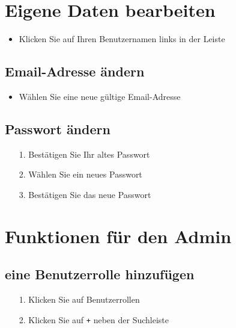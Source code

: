 \documentclass[11pt,a4paper]{report}
\begin{document}
	\section{Eigene Daten bearbeiten}
	\begin{itemize}
		\item Klicken Sie auf Ihren Benutzernamen links in der Leiste
	\end{itemize}

	\subsection{Email-Adresse ändern}
		\begin{itemize}
		\item Wählen Sie eine neue gültige Email-Adresse
	\end{itemize}

	\subsection{Passwort ändern}
	\begin{itemize}
		\item[1.] Bestätigen Sie Ihr altes Passwort
		\item[2.] Wählen Sie ein neues Passwort
		\item[3.] Bestätigen Sie das neue Passwort
	\end{itemize}

	\section{Funktionen für den Admin}
	\subsection{eine Benutzerrolle hinzufügen}

	\begin{itemize}
		\item[1.] Klicken Sie auf \glqq{}Benutzerrollen\grqq{}
		\item[2.] Klicken Sie auf \texttt{+} neben der Suchleiste
	\end{itemize}
\end{document}
